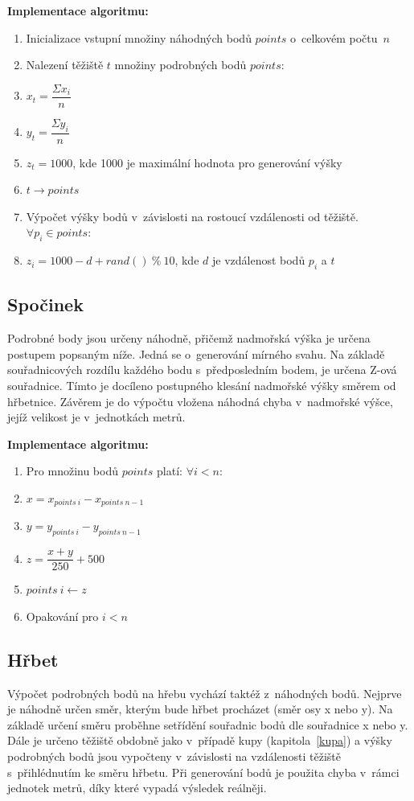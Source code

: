 \documentclass[a4paper, 12pt, oneside, titlepage]{article} %
\begin{document}
\textbf{Implementace algoritmu:}
\begin{enumerate}
\item Inicializace vstupní množiny náhodných bodů $points$ o~celkovém počtu~$n$
\item Nalezení těžiště $t$ množiny podrobných bodů $points$:
\item \quad $x_t= \dfrac{\Sigma x_i}{n}$ 
\item \quad $y_t= \dfrac{\Sigma y_i}{n}$
\item \quad $z_t= 1000$, kde 1000 je maximální hodnota pro generování výšky
\item $t \rightarrow points$
\item Výpočet výšky bodů v~závislosti na rostoucí vzdálenosti od těžiště. $\forall p_i \in points$:
\item \quad $z_i=1000-d+rand()~\%~10$, kde $d$ je vzdálenost bodů $p_i$ a $t$
\end{enumerate}

\subsection{Spočinek}
Podrobné body jsou určeny náhodně, přičemž nadmořská výška je určena postupem popsaným níže. Jedná se o~generování mírného svahu. Na základě souřadnicových rozdílu každého bodu s~předposledním bodem, je určena Z-ová souřadnice. Tímto je docíleno postupného klesání nadmořské výšky směrem od hřbetnice. Závěrem je do výpočtu vložena náhodná chyba v~nadmořské výšce, jejíž velikost je v~jednotkách metrů.

\textbf{Implementace algoritmu:}
\begin{enumerate}
\item Pro množinu bodů $points$ platí: $\forall i<n$:
\item \quad $x=x_{points~i}-x_{points~n-1}$
\item \quad $y=y_{points~i}-y_{points~n-1}$
\item \quad $z=\dfrac{x+y}{250}+500$
\item \quad $points~i \leftarrow z$
\item Opakování pro $i<n$
\end{enumerate}

\subsection{Hřbet}\label{hrbet}
Výpočet podrobných bodů na hřebu vychází taktéž z~náhodných bodů. Nejprve je náhodně určen směr, kterým bude hřbet procházet (směr osy x nebo y). Na základě určení směru proběhne setřídění souřadnic bodů dle souřadnice x nebo y. Dále je určeno těžiště obdobně jako v~případě kupy (kapitola~\ref{kupa}) a výšky podrobných bodů jsou vypočteny v~závislosti na vzdálenosti těžiště s~přihlédnutím ke směru hřbetu. Při generování bodů je použita chyba v~rámci jednotek metrů, díky které vypadá výsledek reálněji. 
\end{document}

